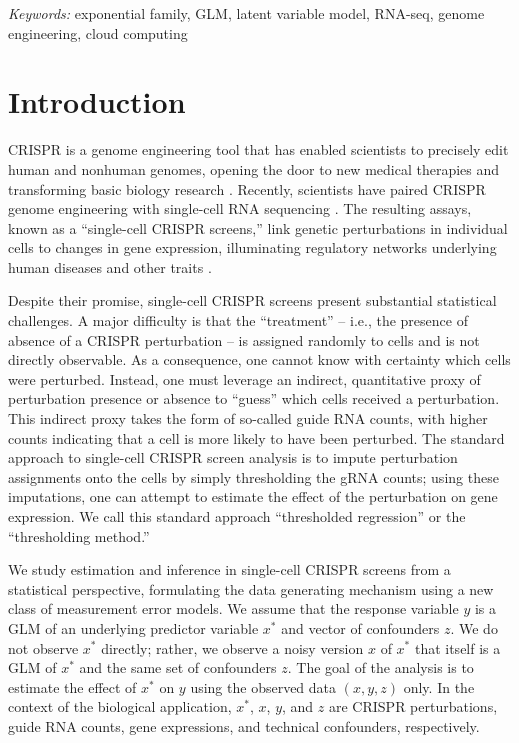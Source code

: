 \documentclass[12pt]{article}
\begin{document}
\noindent%
{\it Keywords:} exponential family, GLM, latent variable model, RNA-seq, genome engineering, cloud computing


\section{Introduction}
CRISPR is a genome engineering tool that has enabled scientists to precisely edit human and nonhuman genomes, opening the door to new medical therapies \parencite{Rothgangl2021,Musunuru2021} and transforming basic biology research \parencite{Przybyla2021}. Recently, scientists have paired CRISPR genome engineering with single-cell RNA sequencing \parencite{Dixit2016,Datlinger2017}. The resulting assays, known as a ``single-cell CRISPR screens,'' link genetic perturbations in individual cells to changes in gene expression, illuminating regulatory networks underlying human diseases and other traits \parencite{Morris2021a}.

Despite their promise, single-cell CRISPR screens present substantial statistical challenges. A major difficulty is that the ``treatment'' -- i.e., the presence of absence of a CRISPR perturbation -- is assigned randomly to cells and is not directly observable. As a consequence, one cannot know with certainty which cells were perturbed. Instead, one must leverage an indirect, quantitative proxy of perturbation presence or absence to ``guess'' which cells received a perturbation. This indirect proxy takes the form of so-called guide RNA counts, with higher counts indicating that a cell is more likely to have been perturbed. The standard approach to single-cell CRISPR screen analysis is to impute perturbation assignments onto the cells by simply thresholding the gRNA counts; using these imputations, one can attempt to estimate the effect of the perturbation on gene expression. We call this standard approach ``thresholded regression'' or the ``thresholding method.''

We study estimation and inference in single-cell CRISPR screens from a statistical perspective, formulating the data generating mechanism using a new class of measurement error models. We assume that the response variable $y$ is a GLM of an underlying predictor variable $x^*$ and vector of confounders $z$. We do not observe $x^*$ directly; rather, we observe a noisy version $x$ of $x^*$ that itself is a GLM of $x^*$ and the same set of confounders $z$. The goal of the analysis is to estimate the effect of $x^*$ on $y$ using the observed data $(x, y, z)$ only. In the context of the biological application, $x^*$, $x$, $y$, and $z$ are CRISPR perturbations, guide RNA counts, gene expressions, and technical confounders, respectively.
\end{document}
